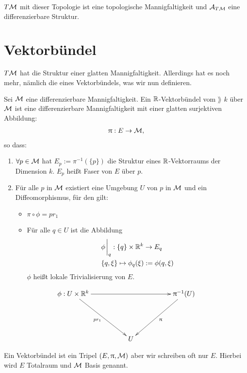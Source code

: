 \begin{satz}
$T\mathcal{M}$ mit dieser Topologie ist eine topologische Mannigfaltigkeit und $\mathcal{A}_{T\mathcal{M}}$ eine differenzierbare Struktur.
\end{satz}
\section{Vektorbündel}
$T\mathcal{M}$ hat die Struktur einer glatten Mannigfaltigkeit.
Allerdings hat es noch mehr, nämlich die eines Vektorbündels, was wir nun definieren.
\begin{defs}[Vektorbündel]
Sei $\mathcal{M}$ eine differenzierbare Mannigfaltigkeit.
Ein $\mathbb{R}$-Vektorbündel vom $\rang$ $k$ über $\mathcal{M}$ ist eine differenzierbare Mannigfaltigkeit mit einer glatten surjektiven Abbildung:
\begin{align}
\uppi: E \to \mathcal{M},
\end{align}
so dass:
\begin{enumerate}
\item $\forall p \in \mathcal{M}$ hat $E_p:= \pi^{-1}( \{ p \})$ die Struktur eines $\mathbb{R}$-Vektorraums der Dimension $k$.
$E_p$ heißt Faser von $E$ über $p$.
\item Für alle $p$ in $\mathcal{M}$ existiert eine Umgebung $U$ von $p$ in $\mathcal{M}$ und ein Diffeomorphismus, für den gilt:
\begin{itemize}
\item $\pi \circ \phi = p r_1$
\item Für alle $q \in U$ ist die Abbildung
\begin{align}
&\phi\eval_q : \{ q \} \times \R^k \to E_q\\
&\{ q, \xi \} \mapsto \phi_q (\xi) := \phi(q, \xi)
\end{align}
$\phi$ heißt lokale Trivialisierung von $E$.
\end{itemize}
\end{enumerate}
\begin{align}
\begin{xy}
\xymatrix@=0.15\linewidth{
      \phi: U \times \R^k \ar[rr] \ar[rd]_{pr_1}  &     &  \pi^{-1}(U) \ar[dl]^{\pi}  \\
                             &  U  &}
\end{xy}
\end{align}
\end{defs}
\begin{bem}
Ein Vektorbündel ist ein Tripel $(E, \uppi, \mathcal{M})$ aber wir schreiben oft nur $E$. Hierbei wird $E$ Totalraum und $\mathcal{M}$ Basis genannt.
\end{bem}
